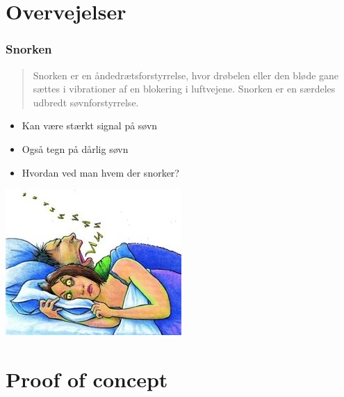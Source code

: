 \section{Overvejelser}

\begin{frame}
\frametitle{Snorken}
	\begin{quote}
	Snorken er en åndedrætsforstyrrelse, hvor drøbelen eller den bløde gane sættes i vibrationer af en blokering i luftvejene.
	Snorken er en særdeles udbredt søvnforstyrrelse.
	\end{quote}	

	\begin{itemize}
		\item Kan være stærkt signal på søvn
		\item Også tegn på dårlig søvn
		\item Hvordan ved man hvem der snorker?
	\end{itemize}
	\centering
	\includegraphics[scale=0.4]{snorken}
\end{frame}

\section{Proof of concept}

